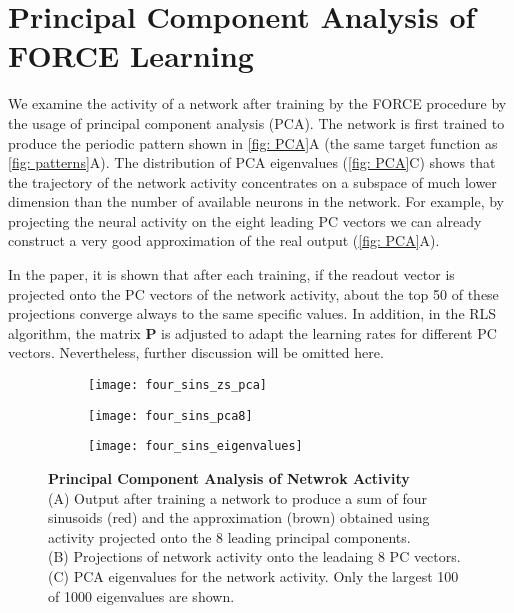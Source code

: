 \section{Principal Component Analysis of FORCE Learning}

We examine the activity of a network after training by the FORCE procedure
by the usage of principal component analysis (PCA). The network is first
trained to produce the periodic pattern shown in \autoref{fig: PCA}A
(the same target function as \autoref{fig: patterns}A). The distribution
of PCA eigenvalues (\autoref{fig: PCA}C) shows that the trajectory of 
the network activity concentrates on a subspace of much lower dimension
than the number of available neurons in the network. For example, by
projecting the neural activity on the eight leading PC vectors we can
already construct a very good approximation of the real output 
(\autoref{fig: PCA}A).

In the paper, it is shown that after each training, if the readout vector
is projected onto the PC vectors of the network activity, about the top 50 of
these projections converge always to the same specific values. 
In addition, in the RLS algorithm, the matrix $\mathbf{P}$
is adjusted to adapt the learning rates for different PC vectors. 
Nevertheless, further discussion will be omitted here.

\begin{figure}[H]
  \centering
  \begin{subfigure}{0.48\textwidth}
    \centering
    \texttt{[image: four\_sins\_zs\_pca]}
    \subcaption{}
  \end{subfigure}
  \begin{subfigure}{0.48\textwidth}
    \centering
    \texttt{[image: four\_sins\_pca8]}
    \subcaption{}
  \end{subfigure}
  \flushleft
  \vspace{-1em}
  \hspace{1em}
  \begin{subfigure}{0.6\textwidth}
    \centering
    \texttt{[image: four\_sins\_eigenvalues]}
    \subcaption{}
  \end{subfigure}
  \caption{
    \textbf{Principal Component Analysis of Netwrok Activity}\\[0.1em]
    (A) Output after training a network to produce a sum of four sinusoids
    (red) and the approximation (brown) obtained using activity
    projected onto the 8 leading principal components.\\[0.1em]
    (B) Projections of network activity onto the leadaing 8 PC vectors.
    \\[0.1em]
    (C) PCA eigenvalues for the network activity. Only the largest 100
    of 1000 eigenvalues are shown.
  }
  \label{fig: PCA}
\end{figure}


